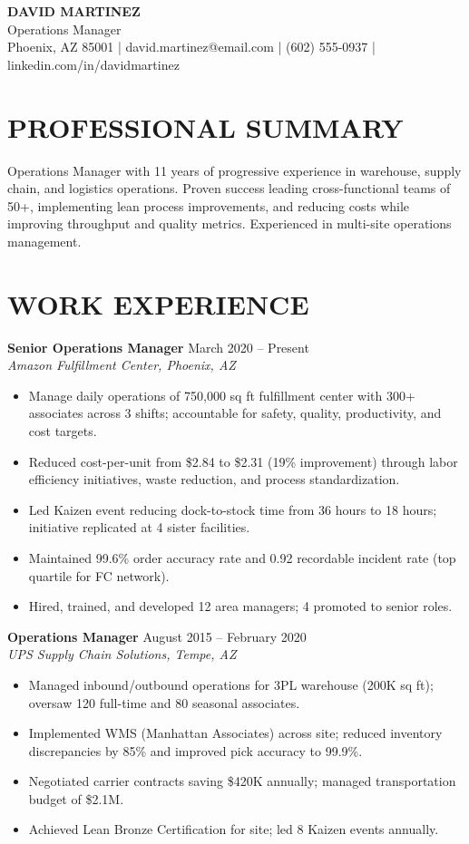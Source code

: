\documentclass[11pt,a4paper]{article}
\begin{document}
\begin{center}
  {\Large \textbf{DAVID MARTINEZ}}\\[4pt]
  Operations Manager\\[3pt]
  Phoenix, AZ 85001 \quad | \quad
  david.martinez@email.com \quad | \quad
  (602) 555-0937 \quad | \quad
  linkedin.com/in/davidmartinez
\end{center}

\section{PROFESSIONAL SUMMARY}
Operations Manager with 11 years of progressive experience in warehouse, supply chain, and logistics operations. Proven success leading cross-functional teams of 50+, implementing lean process improvements, and reducing costs while improving throughput and quality metrics. Experienced in multi-site operations management.

\section{WORK EXPERIENCE}

\noindent\textbf{Senior Operations Manager} \hfill March 2020 -- Present\\
\textit{Amazon Fulfillment Center, Phoenix, AZ}
\begin{itemize}
  \item Manage daily operations of 750,000 sq ft fulfillment center with 300+ associates across 3 shifts; accountable for safety, quality, productivity, and cost targets.
  \item Reduced cost-per-unit from \$2.84 to \$2.31 (19\% improvement) through labor efficiency initiatives, waste reduction, and process standardization.
  \item Led Kaizen event reducing dock-to-stock time from 36 hours to 18 hours; initiative replicated at 4 sister facilities.
  \item Maintained 99.6\% order accuracy rate and 0.92 recordable incident rate (top quartile for FC network).
  \item Hired, trained, and developed 12 area managers; 4 promoted to senior roles.
\end{itemize}

\vspace{4pt}
\noindent\textbf{Operations Manager} \hfill August 2015 -- February 2020\\
\textit{UPS Supply Chain Solutions, Tempe, AZ}
\begin{itemize}
  \item Managed inbound/outbound operations for 3PL warehouse (200K sq ft); oversaw 120 full-time and 80 seasonal associates.
  \item Implemented WMS (Manhattan Associates) across site; reduced inventory discrepancies by 85\% and improved pick accuracy to 99.9\%.
  \item Negotiated carrier contracts saving \$420K annually; managed transportation budget of \$2.1M.
  \item Achieved Lean Bronze Certification for site; led 8 Kaizen events annually.
\end{itemize}
\end{document}
